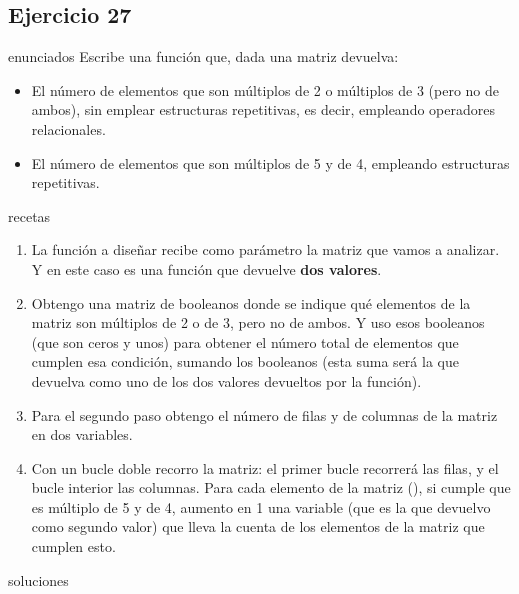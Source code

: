 \subsection{Ejercicio 27}
\def\parte{enunciados}
\ifx\capitulo\parte
Escribe una función que, dada una matriz devuelva:

\begin{itemize}
\item El número de elementos que son múltiplos de 2 o múltiplos de 3 (pero no de ambos), sin emplear estructuras repetitivas, es decir, empleando operadores relacionales.
\item El número de elementos que son múltiplos de 5 y de 4, empleando estructuras repetitivas.
\end{itemize}
\fi

\def\parte{recetas}
\ifx\capitulo\parte
\begin{enumerate}
\item La función a diseñar recibe como parámetro la matriz que vamos a analizar. Y en este caso es una función que devuelve \textbf{dos valores}.
\item Obtengo una matriz de booleanos donde se indique qué elementos de la matriz son múltiplos de 2 o de 3, pero no de ambos. Y uso esos booleanos (que son ceros y unos) para obtener el número total de elementos que cumplen esa condición, sumando los booleanos (esta suma será la que devuelva como uno de los dos valores devueltos por la función).
\item Para el segundo paso obtengo el número de filas y de columnas de la matriz en dos variables.
\item Con un bucle  doble recorro la matriz: el primer bucle recorrerá las filas, y el bucle interior las columnas. Para cada elemento de la matriz (), si cumple que es múltiplo de 5 y de 4, aumento en 1 una variable (que es la que devuelvo como segundo valor) que lleva la cuenta de los elementos de la matriz que cumplen esto.
\end{enumerate}
\fi

\def\parte{soluciones}
\ifx\capitulo\parte

\fi
